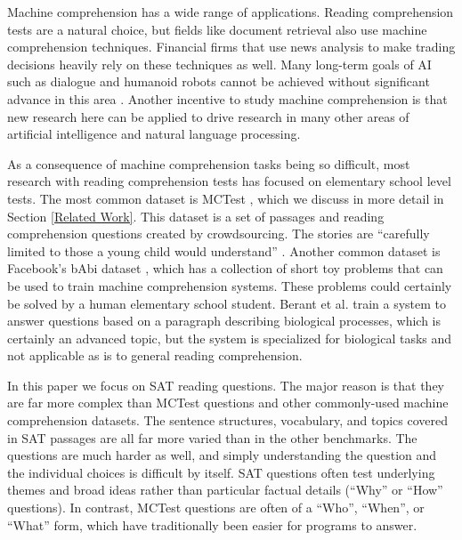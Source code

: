 \documentclass[pageno]{jpaper}
\begin{document}
Machine comprehension has a wide range of applications. Reading comprehension
tests are a natural choice, but fields like document retrieval also use machine
comprehension techniques. Financial firms that use news analysis to make
trading decisions heavily rely on these techniques as well. Many long-term
goals of AI such as dialogue and humanoid robots cannot be achieved without
significant advance in this area \cite{Weston2015}. Another incentive to
study machine comprehension is that new research here can be applied to drive
research in many other areas of artificial intelligence and natural language
processing.

As a consequence of machine comprehension tasks being so difficult, most
research with reading comprehension tests has focused on elementary school level
tests. The most common dataset is MCTest \cite{Richardson2013}, which we discuss
in more detail in Section \ref{Related Work}. This dataset is a set of passages
and reading comprehension questions created by crowdsourcing. The stories are
``carefully limited to those a young child would understand''
\cite{Richardson2013}. Another common dataset is Facebook's bAbi dataset
\cite{Weston2015}, which has a collection of short toy problems that can be used
to train machine comprehension systems. These problems could certainly be solved
by a human elementary school student. Berant et al. \cite{Berant2014} train a
system to answer questions based on a paragraph describing biological processes,
which is certainly an advanced topic, but the system is specialized for
biological tasks and not applicable as is to general reading comprehension.

In this paper we focus on SAT reading questions. The major reason is that they
are far more complex than MCTest questions and other commonly-used machine
comprehension datasets. The sentence structures, vocabulary, and topics covered
in SAT passages are all far more varied than in the other benchmarks. The
questions are much harder as well, and simply understanding the question and the
individual choices is difficult by itself. SAT questions often test underlying
themes and broad ideas rather than particular factual details (``Why'' or
``How'' questions). In contrast, MCTest questions are often of a ``Who'',
``When'', or ``What'' form, which have traditionally been easier for programs to
answer.
\end{document}
